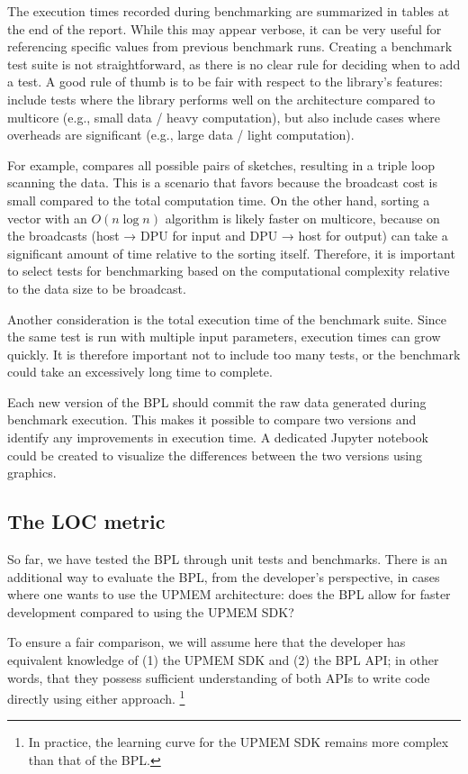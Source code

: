 The execution times recorded during benchmarking are summarized in tables at the end of the report. While this may appear verbose, it can be very useful for referencing specific values from previous benchmark runs. Creating a benchmark test suite is not straightforward, as there is no clear rule for deciding when to add a test. A good rule of thumb is to be fair with respect to the library’s features: include tests where the library performs well on the \UPMEM architecture compared to multicore (e.g., small data / heavy computation), but also include cases where \UPMEM overheads are significant (e.g., large data / light computation).

For example,  compares all possible pairs of sketches, resulting in a triple loop scanning the data. This is a scenario that favors \UPMEM because the broadcast cost is small compared to the total computation time. On the other hand, sorting a vector with an $O(n \log n)$ algorithm is likely faster on multicore, because on \UPMEM the broadcasts (host → DPU for input and DPU → host for output) can take a significant amount of time relative to the sorting itself. Therefore, it is important to select tests for benchmarking based on the computational complexity relative to the data size to be broadcast.

Another consideration is the total execution time of the benchmark suite. Since the same test is run with multiple input parameters, execution times can grow quickly. It is therefore important not to include too many tests, or the benchmark could take an excessively long time to complete.

Each new version of the BPL should commit the raw data generated during benchmark execution. This makes it possible to compare two versions and identify any improvements in execution time. A dedicated Jupyter notebook could be created to visualize the differences between the two versions using graphics.

\subsection{The LOC metric}

So far, we have tested the BPL through unit tests and benchmarks.
There is an additional way to evaluate the BPL, from the developer's perspective, in cases where one wants to use the UPMEM architecture: does the BPL allow for faster development compared to using the UPMEM SDK?

To ensure a fair comparison, we will assume here that the developer has equivalent knowledge of (1) the UPMEM SDK and (2) the BPL API; in other words, that they possess sufficient understanding of both APIs to write code directly using either approach.
\footnote{In practice, the learning curve for the UPMEM SDK remains more complex than that of the BPL.}

